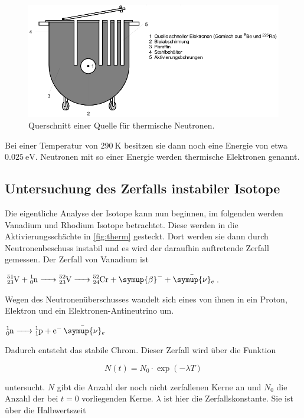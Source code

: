 \begin{figure}
    \centering
    \includegraphics[width=\textwidth]{images/bild1.png}
    \caption{Querschnitt einer Quelle für thermische Neutronen.\cite{V702}}
    \label{fig:therm}
\end{figure}

Bei einer Temperatur von $\SI{290}{\kelvin}$ besitzen sie dann noch eine Energie von etwa $\SI{0.025}{\electronvolt}$.
Neutronen mit so einer Energie werden thermische Elektronen genannt.

\subsection{Untersuchung des Zerfalls instabiler Isotope}
\label{ssec:t4}

Die eigentliche Analyse der Isotope kann nun beginnen, im folgenden werden Vanadium und Rhodium Isotope betrachtet.
Diese werden in die Aktivierungsschächte in \autoref{fig:therm} gesteckt.
Dort werden sie dann durch Neutronenbeschuss instabil und es wird der daraufhin auftretende Zerfall gemessen.
Der Zerfall von Vanadium ist

$\ce{^{51}_{23}V + ^{1}_0n -> ^{52}_{23}V -> ^{52}_{24}Cr + \symup{\beta}- + \bar{\symup{\nu}}_e}$.

Wegen des Neutronenüberschusses wandelt sich eines von ihnen in ein Proton, Elektron und ein Elektronen-Antineutrino um.

$\ce{^{1}_0n -> ^{1}_1p + e- \bar{\symup{\nu}}_e}$

Dadurch entsteht das stabile Chrom.
Dieser Zerfall wird über die Funktion 

\begin{equation}
    N \left(t\right) = N_0 \cdot \exp(-\lambda T)
    \label{eq:zerfall}
\end{equation}

untersucht.
$N$ gibt die Anzahl der noch nicht zerfallenen Kerne an und $N_0$ die Anzahl der bei $t = 0$ vorliegenden Kerne.
$\lambda$ ist hier die Zerfallskonstante.
Sie ist über die Halbwertszeit 

